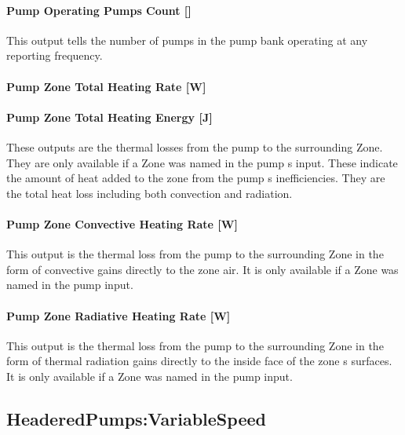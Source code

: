 \paragraph{Pump Operating Pumps Count {[]}}\label{pump-operating-pumps-count}

This output tells the number of pumps in the pump bank operating at any reporting frequency.

\paragraph{Pump Zone Total Heating Rate {[}W{]}}\label{pump-zone-total-heating-rate-w-3}

\paragraph{Pump Zone Total Heating Energy {[}J{]}}\label{pump-zone-total-heating-energy-j-3}

These outputs are the thermal losses from the pump to the surrounding Zone. They are only available if a Zone was named in the pump s input. These indicate the amount of heat added to the zone from the pump s inefficiencies. They are the total heat loss including both convection and radiation.

\paragraph{Pump Zone Convective Heating Rate {[}W{]}}\label{pump-zone-convective-heating-rate-w-3}

This output is the thermal loss from the pump to the surrounding Zone in the form of convective gains directly to the zone air. It is only available if a Zone was named in the pump input.

\paragraph{Pump Zone Radiative Heating Rate {[}W{]}}\label{pump-zone-radiative-heating-rate-w-3}

This output is the thermal loss from the pump to the surrounding Zone in the form of thermal radiation gains directly to the inside face of the zone s surfaces. It is only available if a Zone was named in the pump input.

\subsection{HeaderedPumps:VariableSpeed}\label{headeredpumpsvariablespeed}


